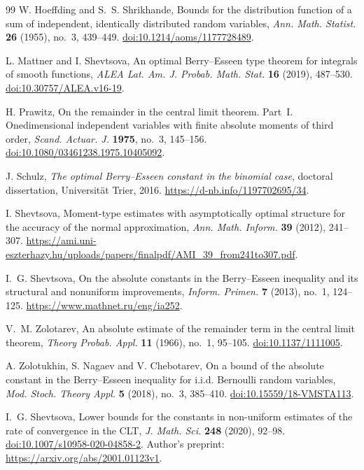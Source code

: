 \documentclass[aop]{imsart}
\theoremstyle{plain}
\theoremstyle{definition}
\theoremstyle{definition}
\begin{document}
\begin{thebibliography}{99}
W. Hoeffding and S.~S. Shrikhande,
Bounds for the distribution function of a sum of independent, identically distributed random variables,
\textit{Ann. Math. Statist.} \textbf{26} (1955), no.~3, 439--449.
\href{https://doi.org/10.1214/aoms/1177728489}{doi:10.1214/aoms/1177728489}.

L. Mattner and I. Shevtsova,
An optimal Berry--Esseen type theorem for integrals of smooth functions,
\textit{ALEA Lat. Am. J. Probab. Math. Stat.} \textbf{16} (2019), 487--530.
\href{https://doi.org/10.30757/ALEA.v16-19}{doi:10.30757/ALEA.v16-19}.

H. Prawitz,
On the remainder in the central limit theorem. Part~I.
Onedimensional independent variables with finite absolute moments of third order,
\textit{Scand. Actuar. J.} \textbf{1975}, no.~3, 145--156.
\href{https://doi.org/10.1080/03461238.1975.10405092}{doi:10.1080/03461238.1975.10405092}.

J. Schulz,
\textit{The optimal Berry--Esseen constant in the binomial case},
doctoral dissertation, Universit\"at Trier, 2016.
\url{https://d-nb.info/1197702695/34}.

I. Shevtsova,
Moment-type estimates with asymptotically optimal structure for the accuracy of the normal approximation,
\textit{Ann. Math. Inform.} \textbf{39} (2012), 241--307.
\url{https://ami.uni-eszterhazy.hu/uploads/papers/finalpdf/AMI_39_from241to307.pdf}.

I.~G. Shevtsova,
On the absolute constants in the Berry--Esseen inequality and its structural and nonuniform improvements,
\textit{Inform. Primen.} \textbf{7} (2013), no.~1, 124--125.
\url{https://www.mathnet.ru/eng/ia252}.

V.~M. Zolotarev,
An absolute estimate of the remainder term in the central limit theorem,
\textit{Theory Probab. Appl.} \textbf{11} (1966), no.~1, 95--105.
\href{https://doi.org/10.1137/1111005}{doi:10.1137/1111005}.

A. Zolotukhin, S. Nagaev and V. Chebotarev,
On a bound of the absolute constant in the Berry--Esseen inequality for i.i.d. Bernoulli random variables,
\textit{Mod. Stoch. Theory Appl.} \textbf{5} (2018), no.~3, 385--410.
\href{https://doi.org/10.15559/18-VMSTA113}{doi:10.15559/18-VMSTA113}.

I.~G. Shevtsova,
Lower bounds for the constants in non-uniform estimates of the rate of convergence in the CLT,
\textit{J. Math. Sci.} \textbf{248} (2020), 92--98.
\href{https://doi.org/10.1007/s10958-020-04858-2}{doi:10.1007/s10958-020-04858-2}.
Author's preprint: \url{https://arxiv.org/abs/2001.01123v1}.

\end{thebibliography}
\end{document}
